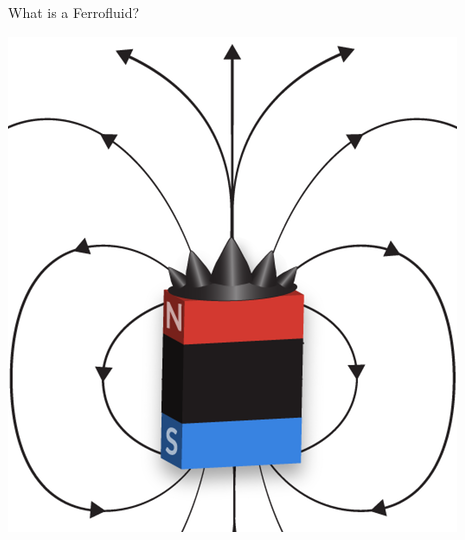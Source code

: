 \documentclass[9pt]{beamer}
\begin{document}
\begin{frame}{What is a Ferrofluid?}
	\begin{minipage}{.3\paperwidth}
		\centering
		\includegraphics[scale=.18]{FerroExplain.png}
	\end{minipage}
\end{frame}
\end{document}
